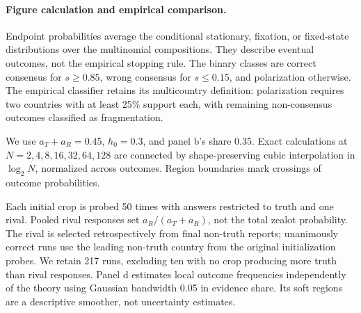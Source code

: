\paragraph{Figure calculation and empirical comparison.}
Endpoint probabilities average the conditional stationary, fixation, or fixed-state distributions over the multinomial compositions. They describe eventual outcomes, not the empirical stopping rule. The binary classes are correct consensus for \(s\geq0.85\), wrong consensus for \(s\leq0.15\), and polarization otherwise. The empirical classifier retains its multicountry definition: polarization requires two countries with at least 25\% support each, with remaining non-consensus outcomes classified as fragmentation.

We use \(a_T+a_R=0.45\), \(h_0=0.3\), and panel b's share 0.35. Exact calculations at \(N=2,4,8,16,32,64,128\) are connected by shape-preserving cubic interpolation in \(\log_2N\), normalized across outcomes. Region boundaries mark crossings of outcome probabilities.

Each initial crop is probed 50 times with answers restricted to truth and one rival. Pooled rival responses set \(a_R/(a_T+a_R)\), not the total zealot probability. The rival is selected retrospectively from final non-truth reports; unanimously correct runs use the leading non-truth country from the original initialization probes. We retain 217 runs, excluding ten with no crop producing more truth than rival responses. Panel d estimates local outcome frequencies independently of the theory using Gaussian bandwidth 0.05 in evidence share. Its soft regions are a descriptive smoother, not uncertainty estimates.
